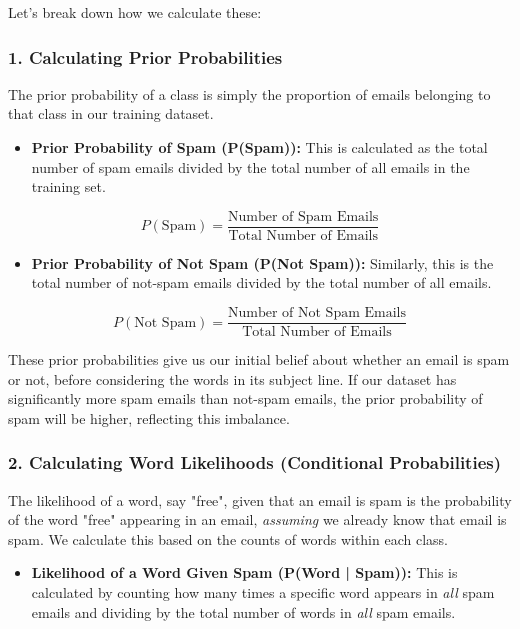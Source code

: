 \documentclass[12pt,a4paper]{article}
\begin{document}
Let's break down how we calculate these:

\subsubsection{1. Calculating Prior Probabilities}

The prior probability of a class is simply the proportion of emails belonging to that class in our training dataset.

\begin{itemize}
    \item \textbf{Prior Probability of Spam (P(Spam)):} This is calculated as the total number of spam emails divided by the total number of all emails in the training set.
\end{itemize}

\[P(\text{Spam}) = \frac{\text{Number of Spam Emails}}{\text{Total Number of Emails}}\]

\begin{itemize}
    \item \textbf{Prior Probability of Not Spam (P(Not Spam)):} Similarly, this is the total number of not-spam emails divided by the total number of all emails.
\end{itemize}

\[P(\text{Not Spam}) = \frac{\text{Number of Not Spam Emails}}{\text{Total Number of Emails}}\]

These prior probabilities give us our initial belief about whether an email is spam or not, before considering the words in its subject line. If our dataset has significantly more spam emails than not-spam emails, the prior probability of spam will be higher, reflecting this imbalance.

\subsubsection{2. Calculating Word Likelihoods (Conditional Probabilities)}

The likelihood of a word, say "free", given that an email is spam is the probability of the word "free" appearing in an email, \textit{assuming} we already know that email is spam. We calculate this based on the counts of words within each class.

\begin{itemize}
    \item \textbf{Likelihood of a Word Given Spam (P(Word | Spam)):} This is calculated by counting how many times a specific word appears in \textit{all} spam emails and dividing by the total number of words in \textit{all} spam emails.
\end{itemize}
\end{document}
